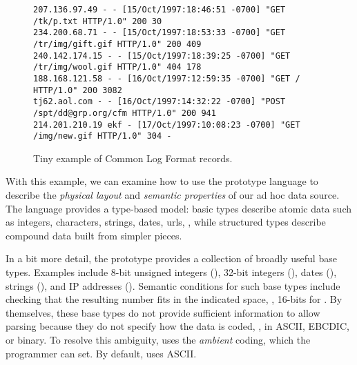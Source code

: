 \documentclass[10pt]{article}
\begin{document}
\begin{figure*}
\begin{footnotesize}
\begin{verbatim}
207.136.97.49 - - [15/Oct/1997:18:46:51 -0700] "GET /tk/p.txt HTTP/1.0" 200 30
234.200.68.71 - - [15/Oct/1997:18:53:33 -0700] "GET /tr/img/gift.gif HTTP/1.0" 200 409
240.142.174.15 - - [15/Oct/1997:18:39:25 -0700] "GET /tr/img/wool.gif HTTP/1.0" 404 178
188.168.121.58 - - [16/Oct/1997:12:59:35 -0700] "GET / HTTP/1.0" 200 3082
tj62.aol.com - - [16/Oct/1997:14:32:22 -0700] "POST /spt/dd@grp.org/cfm HTTP/1.0" 200 941
214.201.210.19 ekf - [17/Oct/1997:10:08:23 -0700] "GET /img/new.gif HTTP/1.0" 304 -
\end{verbatim}
\caption{Tiny example of Common Log Format records. }
\label{figure:clf-records}
\end{footnotesize}
\end{figure*}

With this example, we can examine how to use the prototype 
\pads{} language to describe 
the {\em physical layout} and 
{\em semantic properties} of our ad hoc data source. 
The language provides a type-based model:
basic types describe atomic data such as integers, characters, 
strings, dates, urls, \etc, while
structured types describe compound data built from simpler pieces.

In a bit more detail,
the \pads{} prototype provides a collection of broadly useful base
types.  Examples include 8-bit unsigned integers (), 32-bit
integers (), dates (), strings (),
and IP addresses ().  Semantic conditions for such base types
include checking that the resulting number fits in the indicated
space, \ie, 16-bits for .  By themselves, these base types
do not provide sufficient information to allow parsing because they do
not specify how the data is coded, \ie{}, in ASCII, EBCDIC, or binary.
To resolve this ambiguity, \pads{} uses the \textit{ambient} coding,
which the programmer can set.  By default, \pads{} uses ASCII.  
\end{document}
